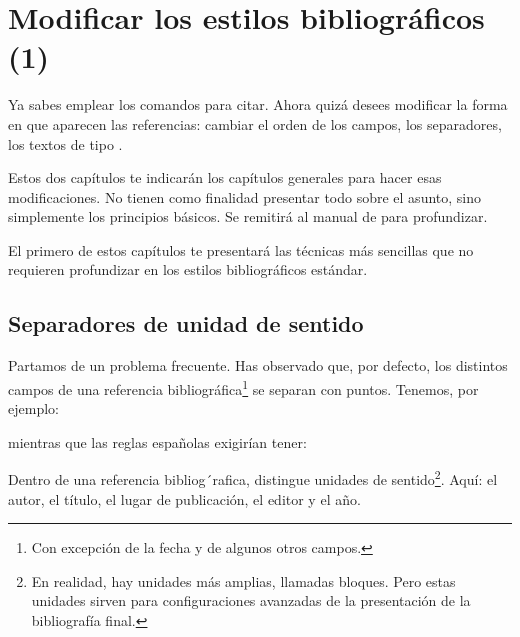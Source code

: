 \chapter{Modificar los estilos bibliográficos (1)}\label{style1}

    \begin{intro}
    
   Ya sabes emplear los comandos para citar. Ahora quizá desees modificar la forma en que aparecen las referencias: cambiar el orden de los campos, los separadores, los textos de tipo .
    
   Estos dos capítulos te indicarán los capítulos generales para hacer esas modificaciones. No tienen como finalidad presentar todo sobre el asunto, sino simplemente los principios básicos. Se remitirá al manual de  para profundizar.
    
   El primero de estos capítulos te presentará las técnicas más sencillas que no requieren profundizar en los estilos bibliográficos estándar. 
    
    
    \end{intro}
    
    
\section{Separadores de unidad de sentido}\label{unitebiblio}
    
Partamos de un problema frecuente. Has observado que, por defecto, los distintos campos de una referencia bibliográfica\footnote{Con excepción de la fecha y de algunos otros campos.} se separan con puntos. Tenemos, por ejemplo:
    
    \bibverbose

    
    \renewcommand{\newunitpunct}[0]{\adddot\addspace} %
    
    \begin{quotation}
    \cite{Urner1952}
    \end{quotation}
    
mientras que las reglas españolas exigirían tener:
    
\renewcommand{\newunitpunct}[0]{\addcomma\addspace} %
    
    \begin{quotation}
    \cite{Urner1952}
    \end{quotation}
    
    \bibverbosetrad

Dentro de una referencia bibliog´rafica,  distingue unidades de sentido\footnote{En realidad, hay unidades más amplias, llamadas bloques. Pero estas unidades sirven para configuraciones avanzadas de la presentación de la bibliografía final.}. Aquí: el autor, el título, el lugar de publicación, el editor y el año. 

